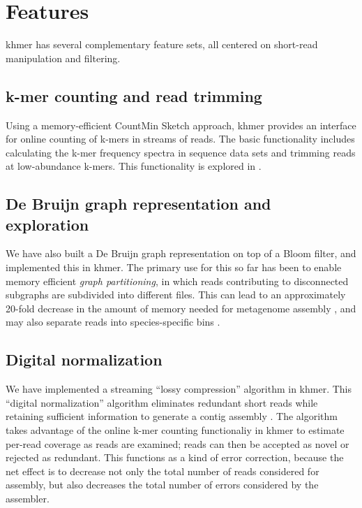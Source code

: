 \documentclass[10pt,a4paper,twocolumn]{article}
\begin{document}
\section*{Features}

khmer has several complementary feature sets, all centered on short-read
manipulation and filtering.

\subsection*{k-mer counting and read trimming}

Using a memory-efficient CountMin Sketch approach, khmer provides an
interface for online counting of k-mers in streams of reads.  The
basic functionality includes calculating the k-mer frequency spectra
in sequence data sets and trimming reads at low-abundance k-mers.
This functionality is explored in \cite{Zhang2013}.

\subsection*{De Bruijn graph representation and exploration}

We have also built a De Bruijn graph representation on top of a Bloom
filter, and implemented this in khmer.  The primary use for this so
far has been to enable memory efficient {\em graph partitioning}, in
which reads contributing to disconnected subgraphs are subdivided into
different files.  This can lead to an approximately 20-fold decrease
in the amount of memory needed for metagenome assembly
\cite{Pell2012}, and may also separate reads into species-specific
bins \cite{Howe2012}.

\subsection*{Digital normalization}

We have implemented a streaming ``lossy compression'' algorithm in
khmer.  This ``digital normalization'' algorithm eliminates redundant
short reads while retaining sufficient information to generate a
contig assembly \cite{Brown2012}.  The algorithm takes advantage of the online
k-mer counting functionaliy in khmer to estimate per-read coverage as
reads are examined; reads can then be accepted as novel or rejected as
redundant. This functions as a kind of error correction, because the
net effect is to decrease not only the total number of reads considered
for assembly, but also decreases the total number of errors considered
by the assembler.
\end{document}
